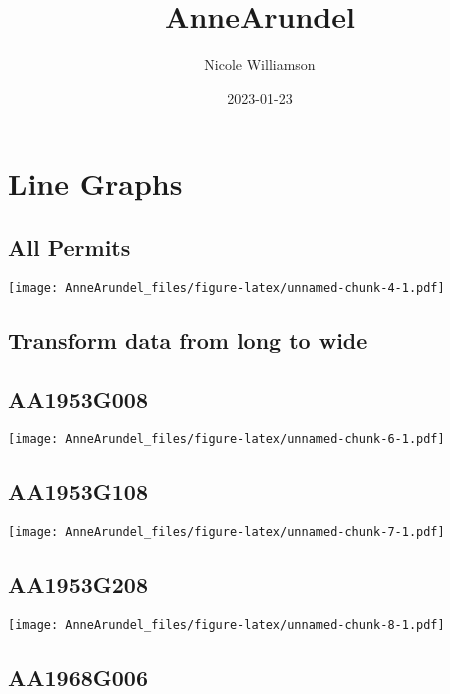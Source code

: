 \documentclass[
]{article}
\title{AnneArundel}
\author{Nicole Williamson}
\date{2023-01-23}
\begin{document}
\maketitle

\hypertarget{line-graphs}{%
\section{Line Graphs}\label{line-graphs}}

\hypertarget{all-permits}{%
\subsection{All Permits}\label{all-permits}}

\texttt{[image: AnneArundel\_files/figure-latex/unnamed-chunk-4-1.pdf]}

\hypertarget{transform-data-from-long-to-wide}{%
\subsection{Transform data from long to
wide}\label{transform-data-from-long-to-wide}}

\hypertarget{aa1953g008}{%
\subsection{AA1953G008}\label{aa1953g008}}

\texttt{[image: AnneArundel\_files/figure-latex/unnamed-chunk-6-1.pdf]}

\hypertarget{aa1953g108}{%
\subsection{AA1953G108}\label{aa1953g108}}

\texttt{[image: AnneArundel\_files/figure-latex/unnamed-chunk-7-1.pdf]}

\hypertarget{aa1953g208}{%
\subsection{AA1953G208}\label{aa1953g208}}

\texttt{[image: AnneArundel\_files/figure-latex/unnamed-chunk-8-1.pdf]}

\hypertarget{aa1968g006}{%
\subsection{AA1968G006}\label{aa1968g006}}
\end{document}
